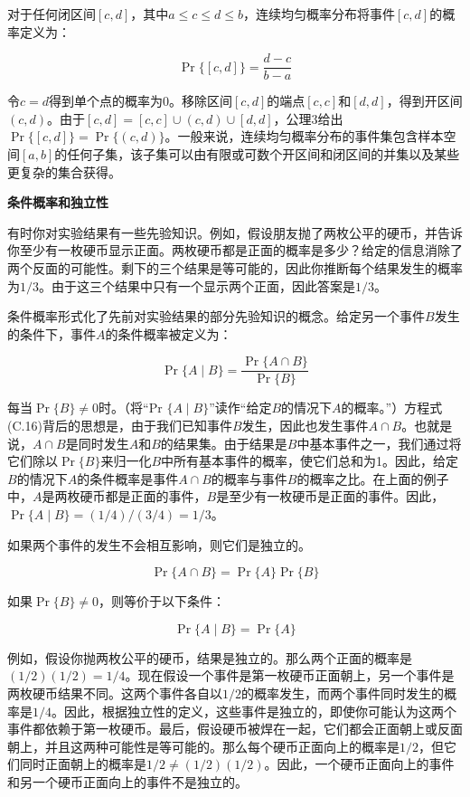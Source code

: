 \documentclass[lang=cn,newtx,10pt,scheme=chinese]{elegantbook}
\begin{document}
对于任何闭区间$[c, d]$，其中$a \leq c \leq d \leq b$，连续均匀概率分布将事件$[c, d]$的概率定义为：

$$
\operatorname{Pr}\{[c, d]\}=\frac{d-c}{b-a}
$$

令$c=d$得到单个点的概率为0。移除区间$[c, d]$的端点$[c, c]$和$[d, d]$，得到开区间$(c, d)$。由于$[c, d]=[c, c] \cup(c, d) \cup[d, d]$，公理3给出$\operatorname{Pr}\{[c, d]\}=\operatorname{Pr}\{(c, d)\}$。一般来说，连续均匀概率分布的事件集包含样本空间$[a, b]$的任何子集，该子集可以由有限或可数个开区间和闭区间的并集以及某些更复杂的集合获得。

\textbf{条件概率和独立性}

有时你对实验结果有一些先验知识。例如，假设朋友抛了两枚公平的硬币，并告诉你至少有一枚硬币显示正面。两枚硬币都是正面的概率是多少？给定的信息消除了两个反面的可能性。剩下的三个结果是等可能的，因此你推断每个结果发生的概率为$1/3$。由于这三个结果中只有一个显示两个正面，因此答案是$1/3$。

条件概率形式化了先前对实验结果的部分先验知识的概念。给定另一个事件$B$发生的条件下，事件$A$的条件概率被定义为：

$$
\operatorname{Pr}\{A \mid B\}=\frac{\operatorname{Pr}\{A \cap B\}}{\operatorname{Pr}\{B\}}
$$

每当$\operatorname{Pr}\{B\} \neq 0$时。（将“Pr $\{A \mid B\}$”读作“给定$B$的情况下$A$的概率。”）方程式(C.16)背后的思想是，由于我们已知事件$B$发生，因此也发生事件$A \cap B$。也就是说，$A \cap B$是同时发生$A$和$B$的结果集。由于结果是$B$中基本事件之一，我们通过将它们除以$\operatorname{Pr}\{B\}$来归一化$B$中所有基本事件的概率，使它们总和为1。因此，给定$B$的情况下$A$的条件概率是事件$A \cap B$的概率与事件$B$的概率之比。在上面的例子中，$A$是两枚硬币都是正面的事件，$B$是至少有一枚硬币是正面的事件。因此，$\operatorname{Pr}\{A \mid B\}=(1 / 4) /(3 / 4)=1 / 3$。

如果两个事件的发生不会相互影响，则它们是独立的。

$$
\operatorname{Pr}\{A \cap B\}=\operatorname{Pr}\{A\} \operatorname{Pr}\{B\}
$$

如果$\operatorname{Pr}\{B\} \neq 0$，则等价于以下条件：

$$
\operatorname{Pr}\{A \mid B\}=\operatorname{Pr}\{A\}
$$

例如，假设你抛两枚公平的硬币，结果是独立的。那么两个正面的概率是$(1 / 2)(1 / 2)=1 / 4$。现在假设一个事件是第一枚硬币正面朝上，另一个事件是两枚硬币结果不同。这两个事件各自以$1/2$的概率发生，而两个事件同时发生的概率是$1/4$。因此，根据独立性的定义，这些事件是独立的，即使你可能认为这两个事件都依赖于第一枚硬币。最后，假设硬币被焊在一起，它们都会正面朝上或反面朝上，并且这两种可能性是等可能的。那么每个硬币正面向上的概率是$1/2$，但它们同时正面朝上的概率是$1/2 \neq(1 / 2)(1 / 2)$。因此，一个硬币正面向上的事件和另一个硬币正面向上的事件不是独立的。
\end{document}
